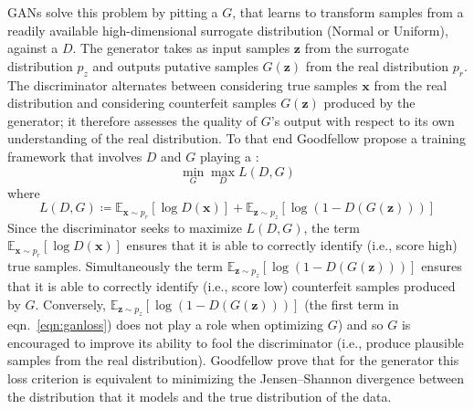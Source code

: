 GANs solve this problem by pitting a  \(G\), that learns to transform samples from a readily available high-dimensional surrogate distribution (Normal or Uniform), against a  \(D\).
The generator takes as input samples \(\bm{z}\) from the surrogate distribution \(p_{z}\) and outputs putative samples \(G(\bm{z})\) from the real distribution \(p_r\).
%
The discriminator alternates between considering true samples \(\bm{x}\) from the real distribution and considering counterfeit samples \(G(\bm{z})\) produced by the generator; it therefore assesses the quality of \(G\)'s output with respect to its own understanding of the real distribution.
%
To that end Goodfellow \etal \cite{goodfellow2014generative} propose a training framework that involves \(D\) and \(G \) playing a :
\begin{equation}
    \min_G \max_D L(D, G)
\end{equation}
where
\begin{equation}
    L(D, G) \coloneqq \mathbb{E}_{\bm{x} \sim p_{r}} [\log D(\bm{x})] + \mathbb{E}_{\bm{z} \sim p_{z} } [\log(1 - D(G(\bm{z})))]
    \label{eqn:ganloss}
\end{equation}
Since the discriminator seeks to maximize \(L(D, G)\), the term \(\mathbb{E}_{\bm{x} \sim p_{r}} [\log D(\bm{x})]\) ensures that it is able to correctly identify (i.e., score high) true samples.
%
Simultaneously the term \(\mathbb{E}_{\bm{z} \sim p_{z} } [\log(1 - D(G(\bm{z})))] \) ensures that it is able to correctly identify (i.e., score low) counterfeit samples produced by \(G\).
%
Conversely, \(\mathbb{E}_{\bm{z} \sim p_{z} } [\log(1 - D(G(\bm{z})))]\) (the first term in eqn.~\eqref{eqn:ganloss}) does not play a role when optimizing \(G\)) and so \(G\) is encouraged to improve its ability to fool the discriminator (i.e., produce plausible samples from the real distribution).
%
Goodfellow \etal prove that for the generator this loss criterion is equivalent to minimizing the Jensen–Shannon divergence between the distribution that it models and the true distribution of the data.
